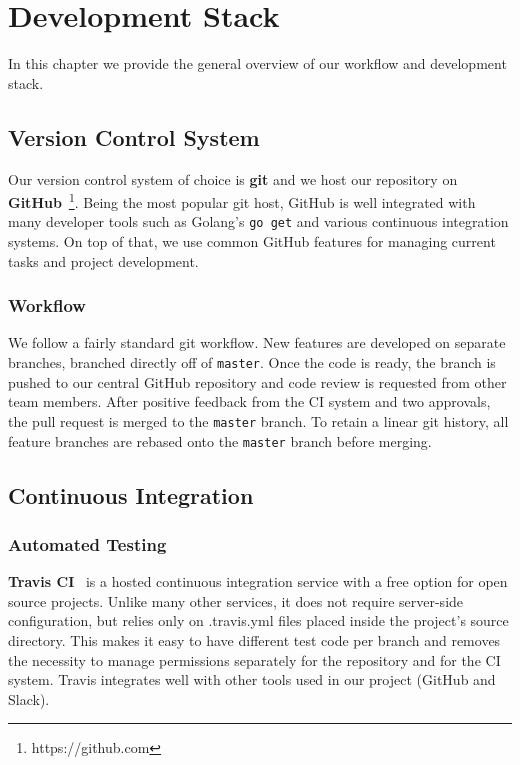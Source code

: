 \chapter{Development Stack}

In this chapter we provide the general overview of our workflow and
development stack.

\section{Version Control System}
Our version control system of choice is \textbf{git} and we host our repository on
\textbf{GitHub}~\footnote{https://github.com}. Being the most popular git host,
GitHub is well integrated  with many developer tools such as Golang’s
\texttt{go get} and various continuous integration systems. On top of that,
we use common GitHub features for managing current tasks and project development.

\subsection{Workflow}
We follow a fairly standard git workflow. New features are developed on 
separate branches, branched directly off of \texttt{master}. Once the code
is ready, the branch is pushed to our central GitHub repository and code 
review is requested from other team members. After positive feedback from 
the CI system and two approvals, the pull request is merged to the 
\texttt{master} branch. To retain a linear git history, all feature branches 
are rebased onto the \texttt{master} branch before merging.

\section{Continuous Integration}

\subsection{Automated Testing}
\textbf{Travis CI}~\cite{travis} is a hosted continuous integration service with
a free option for open source projects.
Unlike many other services, it does not require server-side 
configuration, but relies only on .travis.yml files placed inside 
the project's source directory. This makes it easy to have different test 
code per branch and removes the necessity to manage permissions separately 
for the repository and for the CI system. Travis integrates well with other 
tools used in our project (GitHub and Slack).

